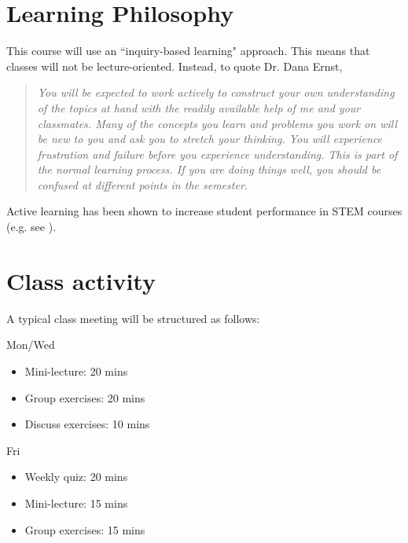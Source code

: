 \documentclass[letterpaper]{inzane_syllabus} %
\begin{document}


\vspace{0.2cm} 
\section{Learning Philosophy}

This course will use an ``inquiry-based learning" approach. This means that classes will not be lecture-oriented. Instead, to quote Dr. Dana Ernst,

\begin{quotation}
\textit{You will be expected to work actively to construct your own understanding of the topics at hand with the readily available help of me and your classmates. Many of the concepts you learn and problems you work on will be new to you and ask you to stretch your thinking. You will experience frustration and failure before you experience understanding. This is part of the normal learning process. If you are doing things well, you should be confused at different points in the semester.}
\end{quotation}

Active learning has been shown to increase student performance in STEM courses (e.g. see \cite{deslauriers2011improved, freeman2014active}). 

\vspace{0.2cm}
\section{Class activity}

A typical class meeting will be structured as follows:

\noindent
\begin{minipage}{0.45\textwidth}
Mon/Wed
\begin{itemize}
\item Mini-lecture: 20 mins
\item Group exercises: 20 mins	
\item Discuss exercises: 10 mins
\end{itemize}
\end{minipage}
\hfill
\begin{minipage}{0.45\textwidth}
Fri
\begin{itemize}
\item Weekly quiz: 20 mins
\item Mini-lecture: 15 mins
\item Group exercises: 15 mins
\end{itemize}
\end{minipage}
\end{document}
